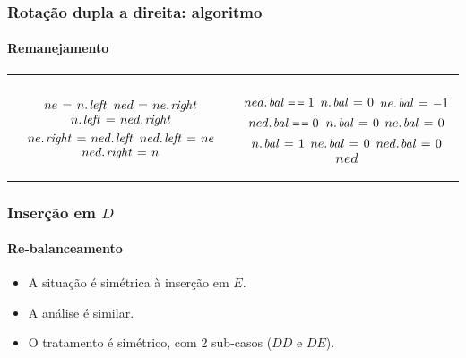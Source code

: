 \documentclass{beamer}
\begin{document}
\begin{frame}

\frametitle{Rotação dupla a direita: algoritmo}
\framesubtitle{Remanejamento}

\begin{tabular}{cc}
\begin{minipage}[t]{.5\textwidth}
\begin{codebox}
\Procname{$\proc{Rotate-Double-Right}(n)$}
\zi $ne \gets \attrib{n}{left}$
\zi $ned \gets \attrib{ne}{right}$
\zi $\attrib{n}{left} \gets \attrib{ned}{right}$
\zi $\attrib{ne}{right} \gets \attrib{ned}{left}$
\zi $\attrib{ned}{left} \gets ne$
\zi $\attrib{ned}{right} \gets n$
\end{codebox}
\end{minipage}
&\begin{minipage}[t]{.45\textwidth}
\begin{codebox}
\zi \If $\attrib{ned}{bal} \isequal 1$
\zi \Then $\attrib{n}{bal} \gets 0$
\zi   $\attrib{ne}{bal} \gets -1$
\zi \Else \If $\attrib{ned}{bal} \isequal 0$
\zi \Then $\attrib{n}{bal} \gets 0$
\zi   $\attrib{ne}{bal} \gets 0$
\zi \Else
\zi   $\attrib{n}{bal} \gets 1$
\zi   $\attrib{ne}{bal} \gets 0$
\zi $\attrib{ned}{bal} \gets 0$
\zi \Return $ned$
\end{codebox}
\end{minipage}
\end{tabular}



\end{frame}

\begin{frame}

\frametitle{Inserção em $D$}
\framesubtitle{Re-balanceamento}

\begin{itemize}

\item A situação é simétrica à inserção em $E$.

\item A análise é similar.

\item O tratamento é simétrico, com 2 sub-casos ($DD$ e $DE$).

\end{itemize}

\end{frame}
\end{document}
